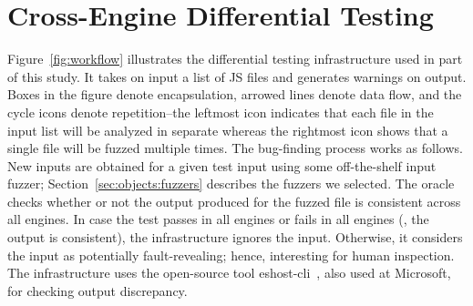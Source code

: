 \documentclass[sigconf,review, anonymous]{acmart}
\begin{document}








\section{Cross-Engine Differential Testing}
\label{sec:design}

Figure~\ref{fig:workflow} illustrates the 
differential testing infrastructure used in part of this study. It takes on
input a list of JS files and generates warnings on output. Boxes in
the figure denote encapsulation, arrowed lines denote data flow, and
the cycle icons denote repetition--the leftmost icon indicates that
each file in the input list will be analyzed in separate whereas the
rightmost icon shows that a single file will be fuzzed multiple times.
The bug-finding process works as follows. New inputs are obtained for
a given test input using some off-the-shelf input
fuzzer; Section~\ref{sec:objects:fuzzers} describes the fuzzers we selected.
The oracle checks whether or not the output produced for the fuzzed
file is consistent across all engines. In case the test passes in all
engines or fails in all engines (\ie{}, the output is consistent), the
infrastructure ignores the input. Otherwise, it considers the input as
potentially fault-revealing; hence, interesting for human
inspection. The infrastructure uses the
open-source tool eshost-cli~\cite{eshost-cli}, also used at
Microsoft, for checking output discrepancy.
\end{document}

